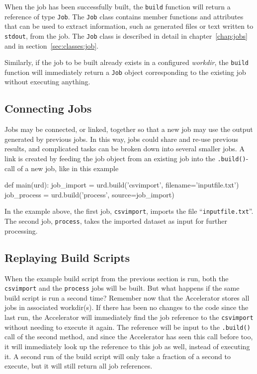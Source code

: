 When the job has been successfully built, the \texttt{build} function
will return a reference of type \texttt{Job}.  The \texttt{Job} class
contains member functions and attributes that can be used to extract
information, such as generated files or text written
to \texttt{stdout}, from the job.  The \texttt{Job} class is described
in detail in chapter~\ref{chap:jobs} and in section~\ref{sec:classes:job}.

Similarly, if the job to be built already exists in a
configured \textsl{workdir}, the \texttt{build} function will
immediately return a \texttt{Job} object corresponding to the existing
job without executing anything.



\subsection{Connecting Jobs}
Jobs may be connected, or linked, together so that a new job may use
the output generated by previous jobs.  In this way, jobs could share
and re-use previous results, and complicated tasks can be broken down
into several smaller jobs.  A link is created by feeding the job
object from an existing job into the \texttt{.build()}-call of a new
job, like in this example
\begin{python}
def main(urd):
    job_import  = urd.build('csvimport', filename='inputfile.txt')
    job_process = urd.build('process',   source=job_import)
\end{python}
In the example above, the first job, \texttt{csvimport}, imports the
file ``\texttt{inputfile.txt}''.  The second job, \texttt{process},
takes the imported dataset as input for further processing.



\subsection{Replaying Build Scripts}

When the example build script from the previous section is run, both
the \texttt{csvimport} and the \texttt{process} jobs will be built.
But what happens if the same build script is run a second time?
Remember now that the Accelerator stores all jobs in associated
workdir(s).  If there has been no changes to the code since the last
run, the Accelerator will immediately find the job reference to
the \texttt{csvimport} without needing to execute it again.  The
reference will be input to the \texttt{.build()} call of the second
method, and since the Accelerator has seen this call before too, it
will immediately look up the reference to this job as well, instead of
executing it.  A second run of the build script will only take a
fraction of a second to execute, but it will still return all job
references.

